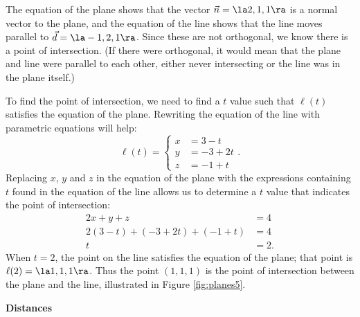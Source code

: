 {The equation of the plane shows that the vector $\vec n = \la 2,1,1\ra$ is a normal vector to the plane, and the equation of the line shows that the line moves parallel to $\vec d = \la -1,2,1\ra$. Since these are not orthogonal, we know there is a point of intersection. (If there were orthogonal, it would mean that the plane and line were parallel to each other, either never intersecting or the line was in the plane itself.)

To find the point of intersection, we need to find a $t$ value such that $\ell(t)$ satisfies the equation of the plane. Rewriting the equation of the line with parametric equations will help:
\[
\ell(t) = \left\{\begin{aligned} x&= 3-t\\ y&=-3+2t\\ z&= -1+t \end{aligned}\right..
\]
Replacing $x$, $y$ and $z$ in the equation of the plane with the expressions containing $t$ found in the equation of the line allows us to determine a $t$ value that indicates the point of intersection:
\begin{align*}
2x+y+z &=4 \\
2(3-t) + (-3+2t) + (-1+t) &= 4 \\
t&=2.
\end{align*}
When $t=2$, the point on the line satisfies the equation of the plane; that point is $\ell(2) = \la 1,1,1\ra$. Thus the point $(1,1,1)$ is the point of intersection between the plane and the line, illustrated in Figure \ref{fig:planes5}.
}\pagebreak

\noindent\textbf{\large Distances}\\

